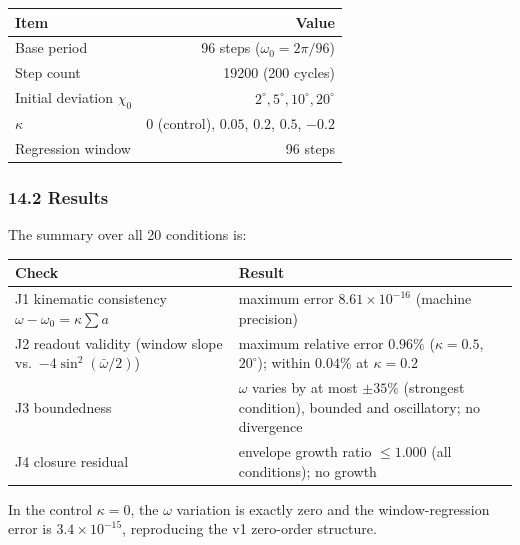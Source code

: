 \documentclass[
  a4paper,
]{article}
\newcounter{none} %
\begin{document}
{\def\LTcaptype{none} %
\begin{longtable}[]{@{}lr@{}}
\toprule\noalign{}
Item & Value \\
\midrule\noalign{}
\endhead
\bottomrule\noalign{}
\endlastfoot
Base period & 96 steps (\(\omega_0=2\pi/96\)) \\
Step count & 19200 (200 cycles) \\
Initial deviation \(\chi_0\) & \(2^\circ,5^\circ,10^\circ,20^\circ\) \\
\(\kappa\) & \(0\) (control), \(0.05\), \(0.2\), \(0.5\), \(-0.2\) \\
Regression window & 96 steps \\
\end{longtable}
}

\subsubsection{14.2 Results}\label{results}

The summary over all 20 conditions is:

{\def\LTcaptype{none} %
\begin{longtable}[]{@{}
  >{\raggedright\arraybackslash}p{}
  >{\raggedright\arraybackslash}p{}@{}}
\toprule\noalign{}
\begin{minipage}[b]{\linewidth}\raggedright
Check
\end{minipage} & \begin{minipage}[b]{\linewidth}\raggedright
Result
\end{minipage} \\
\midrule\noalign{}
\endhead
\bottomrule\noalign{}
\endlastfoot
J1 kinematic consistency \(\omega-\omega_0=\kappa\sum a\) & maximum
error \(8.61\times10^{-16}\) (machine precision) \\
J2 readout validity (window slope vs.~\(-4\sin^2(\bar\omega/2)\)) &
maximum relative error \(0.96\%\) (\(\kappa=0.5\), \(20^\circ\)); within
\(0.04\%\) at \(\kappa=0.2\) \\
J3 boundedness & \(\omega\) varies by at most \(\pm35\%\) (strongest
condition), bounded and oscillatory; no divergence \\
J4 closure residual & envelope growth ratio \(\le1.000\) (all
conditions); no growth \\
\end{longtable}
}

In the control \(\kappa=0\), the \(\omega\) variation is exactly zero
and the window-regression error is \(3.4\times10^{-15}\), reproducing
the v1 zero-order structure.
\end{document}

